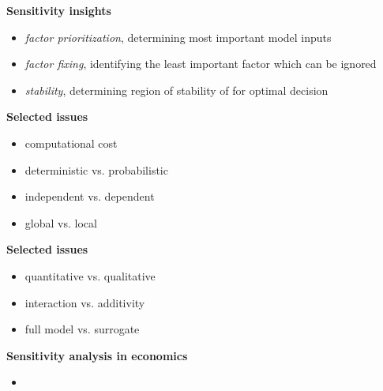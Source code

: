 \begin{frame}\textbf{Sensitivity insights}\vspace{0.3cm}

\begin{itemize}\setlength\itemsep{1em}
  \item \textit{factor prioritization}, determining most important model inputs
  \item \textit{factor fixing}, identifying the least important factor which can be ignored
  \item \textit{stability}, determining region of stability of for optimal decision
\end{itemize}

\end{frame}
\begin{frame}\textbf{Selected issues}\vspace{0.3cm}

\begin{itemize}\setlength\itemsep{1em}
  \item computational cost
  \item deterministic vs. probabilistic
  \item independent vs. dependent
  \item global vs. local
\end{itemize}

\end{frame}
\begin{frame}\textbf{Selected issues}\vspace{0.3cm}

\begin{itemize}\setlength\itemsep{1em}
  \item quantitative vs. qualitative
  \item interaction vs. additivity
  \item full model vs. surrogate
\end{itemize}

\end{frame}
\begin{frame}\textbf{Sensitivity analysis in economics}\vspace{0.3cm}

  \begin{itemize}
  \item {}
  \end{itemize}

\end{frame}
